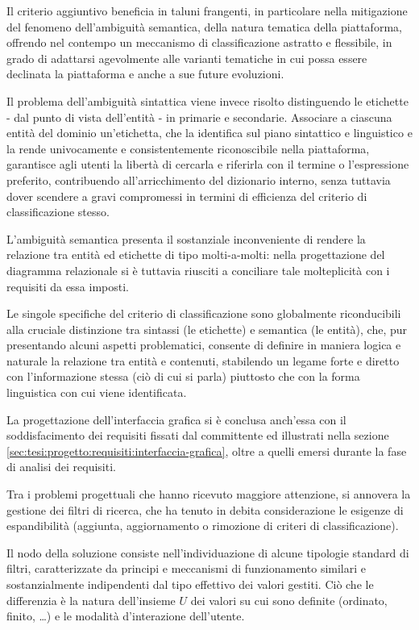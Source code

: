 Il criterio aggiuntivo beneficia in taluni frangenti, in particolare nella mitigazione del fenomeno dell'ambiguità semantica, della natura tematica della piattaforma, offrendo nel contempo un meccanismo di classificazione astratto e flessibile, in grado di adattarsi agevolmente alle varianti tematiche in cui possa essere declinata la piattaforma e anche a sue future evoluzioni.

Il problema dell'ambiguità sintattica viene invece risolto distinguendo le etichette - dal punto di vista dell'entità - in primarie e secondarie. Associare a ciascuna entità del dominio un'etichetta, che la identifica sul piano sintattico e linguistico e la rende univocamente e consistentemente riconoscibile nella piattaforma, garantisce agli utenti la libertà di cercarla e riferirla con il termine o l'espressione preferito, contribuendo all'arricchimento del dizionario interno, senza tuttavia dover scendere a gravi compromessi in termini di efficienza del criterio di classificazione stesso.

L'ambiguità semantica presenta il sostanziale inconveniente di rendere la relazione tra entità ed etichette di tipo molti-a-molti: nella progettazione del diagramma relazionale si è tuttavia riusciti a conciliare tale molteplicità con i requisiti da essa imposti.

Le singole specifiche del criterio di classificazione sono globalmente riconducibili alla cruciale distinzione tra sintassi (le etichette) e semantica (le entità), che, pur presentando alcuni aspetti problematici, consente di definire in maniera logica e naturale la relazione tra entità e contenuti, stabilendo un legame forte e diretto con l'informazione stessa (ciò di cui si parla) piuttosto che con la forma linguistica con cui viene identificata.

La progettazione dell'interfaccia grafica si è conclusa anch'essa con il soddisfacimento dei requisiti fissati dal committente ed illustrati nella sezione \ref{sec:tesi:progetto:requisiti:interfaccia-grafica}, oltre a quelli emersi durante la fase di analisi dei requisiti.

Tra i problemi progettuali che hanno ricevuto maggiore attenzione, si annovera la gestione dei filtri di ricerca, che ha tenuto in debita considerazione le esigenze di espandibilità (aggiunta, aggiornamento o rimozione di criteri di classificazione).

Il nodo della soluzione consiste nell'individuazione di alcune tipologie standard di filtri, caratterizzate da principi e meccanismi di funzionamento similari e sostanzialmente indipendenti dal tipo effettivo dei valori gestiti. Ciò che le differenzia è la natura dell'insieme $U$ dei valori su cui sono definite (ordinato, finito, \ldots) e le modalità d'interazione dell'utente.

